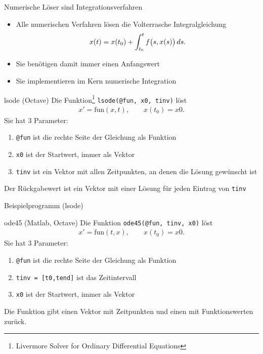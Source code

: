 \begin{frame}{Numerische Löser sind Integrationsverfahren}
  \begin{itemize}
  \item Alle numerischen Verfahren lösen die Volterrasche Integralgleichung
    \begin{gather*}
      x(t) = x(t_0) + \int_{t_0}^t f\bigl(s, x(s)\bigr) \,ds.      
    \end{gather*}
  \item Sie benötigen damit immer einen Anfangswert
  \item Sie implementieren im Kern numerische Integration
  \end{itemize}
\end{frame}

\begin{frame}{lsode (Octave)}
  Die Funktion\footnote{Livermore Solver for Ordinary Differential Equations}
  \lstinline!lsode(@fun, x0, tinv)! löst
  \begin{gather*}
    x' = \text{fun}(x,t), \qquad x(t_0) = x0.
  \end{gather*}
  Sie hat 3 Parameter:
  \begin{enumerate}
  \item \lstinline!@fun! ist die rechte Seite der Gleichung als Funktion
  \item \lstinline!x0! ist der Startwert, immer als Vektor
  \item \lstinline!tinv! ist ein Vektor mit allen Zeitpunkten, an denen
    die Lösung gewünscht ist
  \end{enumerate}
  Der Rückgabewert ist ein Vektor mit einer Lösung für jeden Eintrag
  von \lstinline!tinv!
\end{frame}

\begin{frame}{Beispielprogramm (lsode)}
  

  
\end{frame}

\begin{frame}{ode45 (Matlab, Octave)}
  Die Funktion \lstinline!ode45(@fun, tinv, x0)! löst
  \begin{gather*}
    x' = \text{fun}(t,x), \qquad x(t_0) = x0.
  \end{gather*}
  Sie hat 3 Parameter:
  \begin{enumerate}
  \item \lstinline!@fun! ist die rechte Seite der Gleichung als Funktion
  \item \lstinline!tinv = [t0,tend]! ist das Zeitintervall
  \item \lstinline!x0! ist der Startwert, immer als Vektor
  \end{enumerate}
  Die Funktion gibt einen Vektor mit Zeitpunkten und einen mit
  Funktionswerten zurück.
\end{frame}

